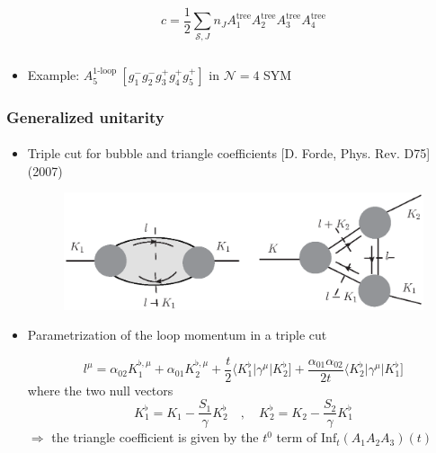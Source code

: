 \documentclass[english]{beamer}
\begin{document}
\begin{frame}[shrink=20]
\begin{itemize}
\begin{columns}
\begin{column}{0.5\textwidth}
\begin{equation*}
c = \frac{1}{2}\sum_{\mathcal{S}, J}n_J A_1^{\mathrm{tree}}A_2^{\mathrm{tree}}A_3^{\mathrm{tree}}A_4^{\mathrm{tree}}
\end{equation*}

\end{column}
\end{columns}
\item<5-> Example:  $A_5^{\textrm{1-loop }}[g_1^-g_2^-g_3^+g_4^+g_5^+]$ in  $\mathcal{N}=4$ SYM

\end{itemize}

\end{frame}
\begin{frame}[shrink=20]
\frametitle{Generalized unitarity}
\framesubtitle{}
\begin{itemize}
\item<1-> Triple cut for bubble and triangle coefficients
\tiny\color{blue}
[D. Forde, Phys. Rev. D75]
(2007)
\color{black}\normalsize
\begin{figure}[h]
  \centering
  \includegraphics[width=0.7\linewidth]{triple_cut.eps}
\end{figure}

\item<2-> Parametrization of the loop momentum in a triple cut

\small
\begin{equation*}
l^\mu = \alpha_{02} K_1^{\flat,\mu} + \alpha_{01}K_2^{\flat,\mu} + \frac{t}{2}\langle K_1^\flat | \gamma^\mu |K_2^\flat] + \frac{\alpha_{01}\alpha_{02}}{2t}\langle K_2^\flat|\gamma^\mu |K_1^\flat]
\end{equation*}
\normalsize
where the two null vectors
\small
\begin{equation*}
K_1^\flat = K_1 - \frac{S_1}{\gamma}K_2^\flat \quad,\quad
K_2^\flat = K_2 - \frac{S_2}{\gamma}K_1^\flat
\end{equation*}
\normalsize
$\Rightarrow$ the triangle coefficient is given by the $t^0$ term of $\mathrm{Inf}_t(A_1A_2A_3)(t)$


\end{itemize}
\end{frame}
\end{document}
